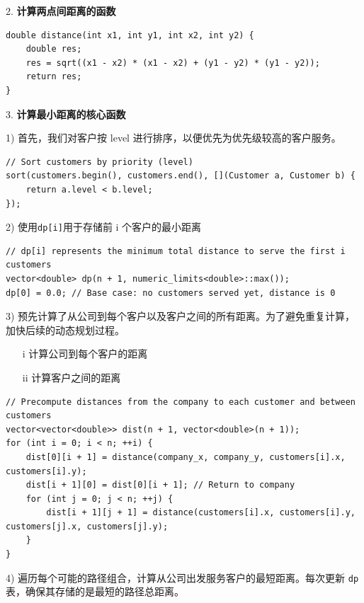 \documentclass[a4paper]{ctexart}
\begin{document}
2. \textbf{计算两点间距离的函数}
\begin{lstlisting}
double distance(int x1, int y1, int x2, int y2) { 
	double res;
	res = sqrt((x1 - x2) * (x1 - x2) + (y1 - y2) * (y1 - y2));
	return res;
}
\end{lstlisting}

3. \textbf{计算最小距离的核心函数}

1) 首先，我们对客户按 level 进行排序，以便优先为优先级较高的客户服务。
\begin{lstlisting}
// Sort customers by priority (level)
sort(customers.begin(), customers.end(), [](Customer a, Customer b) {
	return a.level < b.level;
});
\end{lstlisting}

2) 使用\texttt{dp[i]}用于存储前 i 个客户的最小距离
\begin{lstlisting}
// dp[i] represents the minimum total distance to serve the first i customers
vector<double> dp(n + 1, numeric_limits<double>::max());
dp[0] = 0.0; // Base case: no customers served yet, distance is 0
\end{lstlisting}

3) 预先计算了从公司到每个客户以及客户之间的所有距离。为了避免重复计算，加快后续的动态规划过程。
	\begin{itemize}
		\item[i] 计算公司到每个客户的距离
		
		\item[ii] 计算客户之间的距离 
	\end{itemize}
	
\begin{lstlisting}
// Precompute distances from the company to each customer and between customers
vector<vector<double>> dist(n + 1, vector<double>(n + 1));
for (int i = 0; i < n; ++i) { 
	dist[0][i + 1] = distance(company_x, company_y, customers[i].x, customers[i].y);
	dist[i + 1][0] = dist[0][i + 1]; // Return to company
	for (int j = 0; j < n; ++j) { 
		dist[i + 1][j + 1] = distance(customers[i].x, customers[i].y, customers[j].x, customers[j].y);
	}
}
\end{lstlisting}

4) 遍历每个可能的路径组合，计算从公司出发服务客户的最短距离。每次更新 \texttt{dp}表，确保其存储的是最短的路径总距离。
	
\end{document}
